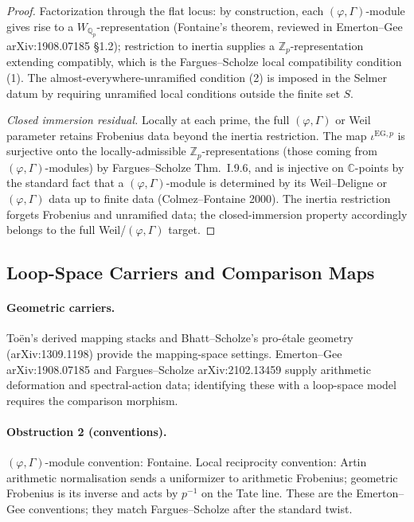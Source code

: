 \begin{proof}
Factorization through the flat locus: by construction, each
\((\varphi,\Gamma)\)-module gives rise to a \(W_{\mathbb{Q}_{p}}\)-representation
(Fontaine's theorem, reviewed in Emerton--Gee arXiv:1908.07185 \S1.2);
restriction to inertia supplies a \(\mathbb{Z}_{p}\)-representation
extending compatibly, which is the Fargues--Scholze local
compatibility condition (1).
The almost-everywhere-unramified condition (2) is imposed in the
Selmer datum by requiring unramified local conditions outside the
finite set \(S\).

\emph{Closed immersion residual.} Locally at each prime, the full
\((\varphi,\Gamma)\) or Weil parameter retains Frobenius data beyond
the inertia restriction. The map \(\iota^{\mathrm{EG},p}\) is
surjective onto the locally-admissible \(\mathbb{Z}_{p}\)-representations
(those coming from \((\varphi,\Gamma)\)-modules) by Fargues--Scholze
Thm.~I.9.6, and is injective on \(\mathbb{C}\)-points by the
standard fact that a \((\varphi,\Gamma)\)-module is determined by
its Weil--Deligne or \((\varphi,\Gamma)\) data up to finite data
(Colmez--Fontaine 2000). The inertia restriction forgets Frobenius
and unramified data; the closed-immersion property accordingly
belongs to the full Weil/\((\varphi,\Gamma)\) target.
\end{proof}

\subsection{Loop-Space Carriers and Comparison Maps}

\paragraph{Geometric carriers.}
To\"en's derived mapping stacks and Bhatt--Scholze's pro-\'etale
geometry (arXiv:1309.1198) provide the mapping-space settings.
Emerton--Gee arXiv:1908.07185 and Fargues--Scholze arXiv:2102.13459
supply arithmetic deformation and spectral-action data; identifying
these with a loop-space model requires the comparison morphism.

\paragraph{Obstruction 2 (conventions).} \((\varphi,\Gamma)\)-module
convention: Fontaine. Local reciprocity convention: Artin arithmetic
normalisation sends a uniformizer to arithmetic Frobenius; geometric
Frobenius is its inverse and acts by \(p^{-1}\) on the Tate line. These
are the Emerton--Gee conventions; they match Fargues--Scholze after the
standard twist.

